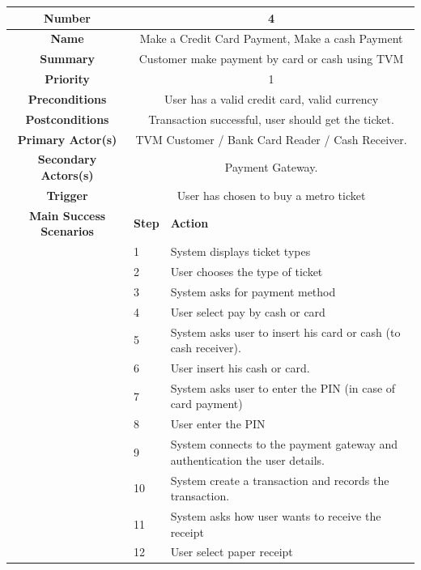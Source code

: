 \documentclass[a4paper,12pt]{report}
\begin{document}
\begin{tabular}{ | c | p{2cm} | p{7cm} |}
	
	\hline
	\textbf{Number} & \multicolumn{2}{c|}{4}  \\
	\hline
	\textbf{Name} & \multicolumn{2}{c|}{Make a Credit Card Payment, Make a cash Payment}  \\
	\hline
	\textbf{Summary} & \multicolumn{2}{c|}{Customer make payment by card or cash using TVM}  \\
	\hline
	\textbf{Priority} & \multicolumn{2}{c|}{1}  \\
	\hline
	\textbf{Preconditions} & \multicolumn{2}{c|}{User has a valid credit card, valid currency}  \\
	\hline
	\textbf{Postconditions} & \multicolumn{2}{c|}{Transaction successful, user should get the ticket.}  \\
	\hline
	\textbf{Primary Actor(s)} & \multicolumn{2}{c|}{TVM Customer / Bank Card Reader / Cash Receiver.}  \\
	\hline
	\textbf{Secondary Actors(s)} & \multicolumn{2}{c|}{Payment Gateway.}  \\
	\hline
	\textbf{Trigger} & \multicolumn{2}{c|}{User has chosen to buy a metro ticket}  \\
	\hline
	\textbf{Main Success Scenarios} & \textbf{Step} & \textbf{Action} \\
	\hline
	& 1 & System displays ticket types \\ 
	\hline
	&  2  & User chooses the type of ticket \\
	\hline
	&  3  & System asks for payment method \\
	\hline
	&  4  & User select pay by cash or card \\
	\hline
	&  5  & System asks user to insert his card or cash (to cash receiver). \\
	\hline
	&  6  & User insert his cash or card. \\
	\hline
	&  7  & System asks user to enter the PIN (in case of card payment) \\
	\hline
	&  8  & User enter the PIN \\
	\hline
	&  9  & System connects to the payment gateway and authentication the user details. \\
	\hline
	&  10  & System create a transaction and records the transaction. \\
	\hline
	&  11  & System asks how user wants to receive the receipt \\
	\hline
	&  12  & User select paper receipt \\
	\hline
	
\end{tabular}
\end{document}
